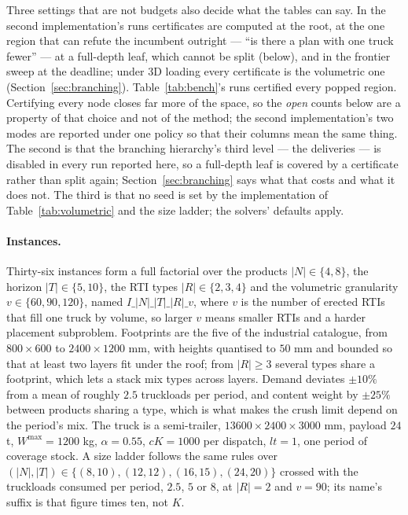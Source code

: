 Three settings that are not budgets also decide what the tables can
say.
In the second implementation's runs certificates are computed at the
root, at the one region that can refute the incumbent outright --- ``is there
a plan with one truck fewer'' --- at a full-depth leaf, which cannot be
split (below), and in the frontier sweep at the deadline; under 3D
loading every certificate is the volumetric one (Section~\ref{sec:branching}).
Table~\ref{tab:bench}'s runs certified every popped region. Certifying
every node closes far more of the space, so the \emph{open} counts
below are a property of that choice and not of the method; the second
implementation's two modes are reported under one policy so that their
columns mean the same thing. The second is that the branching hierarchy's
third level --- the deliveries --- is disabled in every run reported
here, so a full-depth leaf is covered by a certificate rather than
split again; Section~\ref{sec:branching} says what that costs and what
it does not. The third is that no seed is set by the implementation of
Table~\ref{tab:volumetric} and the size ladder; the solvers' defaults
apply.





\paragraph{Instances.}
Thirty-six instances form a full factorial over the products
$|N|\in\{4,8\}$, the horizon $|T|\in\{5,10\}$, the RTI types
$|R|\in\{2,3,4\}$ and the volumetric granularity $v\in\{60,90,120\}$,
named $I\_|N|\_|T|\_|R|\_v$, where $v$ is the number of erected RTIs
that fill one truck by volume, so larger $v$ means smaller RTIs and a
harder placement subproblem. Footprints are the five of the industrial
catalogue, from $800\times600$ to $2400\times1200$ mm, with heights
quantised to $50$ mm and bounded so that at least two layers fit under
the roof; from $|R|\ge3$ several types share a footprint, which lets a
stack mix types across layers. Demand deviates $\pm10\%$ from a mean of
roughly $2.5$ truckloads per period, and content weight by $\pm25\%$
between products sharing a type, which is what makes the crush limit
depend on the period's mix. The truck is a semi-trailer,
$13600\times2400\times3000$ mm, payload $24$ t, $W^{\max}=1200$ kg,
$\alpha=0.55$, $cK=1000$ per dispatch, $lt=1$, one period of coverage
stock. A size ladder follows the same rules over
$(|N|,|T|)\in\{(8,10),(12,12),(16,15),(24,20)\}$ crossed with the
truckloads consumed per period, $2.5$, $5$ or $8$, at $|R|=2$ and
$v=90$; its name's suffix is that figure times ten, not $K$.

